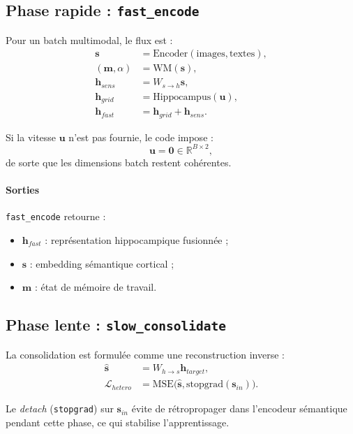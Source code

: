 \documentclass[12pt,a4paper]{article}
\begin{document}
\subsection{Phase rapide : \texttt{fast\_encode}}
Pour un batch multimodal, le flux est :
\begin{align}
\mathbf{s} &= \mathrm{Encoder}(\text{images}, \text{textes}),\\
(\mathbf{m}, \alpha) &= \mathrm{WM}(\mathbf{s}),\\
\mathbf{h}_{sens} &= W_{s\to h}\mathbf{s},\\
\mathbf{h}_{grid} &= \mathrm{Hippocampus}(\mathbf{u}),\\
\mathbf{h}_{fast} &= \mathbf{h}_{grid} + \mathbf{h}_{sens}.
\end{align}

Si la vitesse $\mathbf{u}$ n'est pas fournie, le code impose :
\begin{equation}
\mathbf{u}=\mathbf{0}\in\mathbb{R}^{B\times 2},
\end{equation}
de sorte que les dimensions batch restent cohérentes.

\paragraph{Sorties}
\texttt{fast\_encode} retourne :
\begin{itemize}
    \item $\mathbf{h}_{fast}$ : représentation hippocampique fusionnée ;
    \item $\mathbf{s}$ : embedding sémantique cortical ;
    \item $\mathbf{m}$ : état de mémoire de travail.
\end{itemize}

\subsection{Phase lente : \texttt{slow\_consolidate}}
La consolidation est formulée comme une reconstruction inverse :
\begin{align}
\hat{\mathbf{s}} &= W_{h\to s}\mathbf{h}_{target},\\
\mathcal{L}_{hetero} &= \mathrm{MSE}\big(\hat{\mathbf{s}}, \mathrm{stopgrad}(\mathbf{s}_{in})\big).
\end{align}

Le \textit{detach} (\texttt{stopgrad}) sur $\mathbf{s}_{in}$ évite de rétropropager dans l'encodeur sémantique pendant cette phase, ce qui stabilise l'apprentissage.
\end{document}
